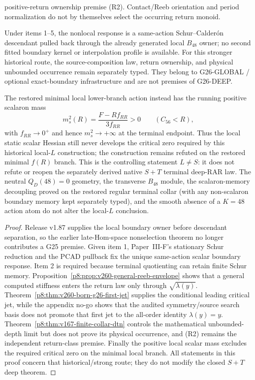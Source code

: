 \documentclass[12pt,a4paper]{article}
\begin{document}
\begin{theorem}
\begin{enumerate}
 positive-return ownership premise (R2).  Contact/Reeb orientation and period
 normalization do not by themselves select the occurring return monoid.
\end{enumerate}
Under items 1--5, the nonlocal response is a same-action
Schur--Calder\'on descendant pulled back through the already generated local
\(B_{48}\) owner; no second fitted boundary kernel or interpolation profile is
available.  For this stronger historical route, the source-composition law, return
ownership, and physical unbounded occurrence remain separately typed.  They
belong to G26-GLOBAL / optional exact-boundary infrastructure and are not
premises of G26-DEEP.

The restored minimal local lower-branch action instead has the running
positive scalaron mass
\[
 m_s^2(R)=\frac{F-Rf_{RR}}{3f_{RR}}>0\qquad(C_{56}<R),
\]
with \(f_{RR}\to0^+\) and hence \(m_s^2\to+\infty\) at the terminal
endpoint.  Thus the local static scalar Hessian still never develops the
critical zero required by this historical local-$L$ construction; the
construction remains refuted on the restored minimal \(f(R)\) branch.  This is the controlling statement
\(L\neq S\): it does not refute or reopen the separately derived native
\(S+T\) terminal deep-RAR law.  The neutral \(Q_D(48)=0\) geometry, the
transverse \(B_{48}\) module, the scalaron-memory decoupling proved on the
restored regular terminal collar (with any non-scalaron boundary memory kept
separately typed), and the smooth absence of a \(K=48\) action atom do not
alter the local-$L$ conclusion.
\end{theorem}

\begin{proof}
Release v1.87 supplies the local boundary owner before descendant separation,
so the earlier late-Hom-space nonselection theorem no longer contributes a
G25 premise.  Given item 1, Paper~III-F's stationary Schur reduction and the
PCAD pullback fix the unique same-action scalar boundary response.  Item 2 is
required because terminal quotienting can retain finite Schur memory.
Proposition~\ref{p8:prop:v260-general-reeb-envelope} shows that a general
computed stiffness enters the return law only through \(\sqrt{\lambda(y)}\).
Theorem~\ref{p8:thm:v260-born-g26-first-jet} supplies the conditional leading
critical jet, while the appendix no-go shows that the audited symmetry/source
search basis does not promote that first jet to the all-order identity
\(\lambda(y)=y\).  Theorem~\ref{p8:thm:v167-finite-collar-dtn} controls the
mathematical unbounded-depth limit but does not prove its physical occurrence,
and (R2) remains the independent return-class premise.  Finally the positive
local scalar mass excludes the required critical zero on the minimal local
branch.  All statements in this proof concern that historical/strong route;
they do not modify the closed $S+T$ deep theorem.
\end{proof}
\end{document}
